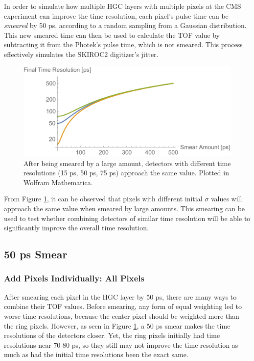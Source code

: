 \documentclass[twocolumn,aps,prd,reprint,superscriptaddress,floatfix]{revtex4-1}
\begin{document}
In order to simulate how multiple HGC layers with multiple pixels at the CMS experiment can improve the time resolution, each pixel's pulse time can be \textit{smeared} by 50 ps, according to a random sampling from a Gaussian distribution.
This new smeared time can then be used to calculate the TOF value by subtracting it from the Photek's pulse time, which is not smeared.
This process effectively simulates the SKIROC2 digitizer's jitter.

\begin{figure}[!htbp]
	\centering
	\includegraphics[width=\linewidth]{mathematica_plot.pdf}
	\caption{After being smeared by a large amount, detectors with different time resolutions (15 ps, 50 ps, 75 ps) approach the same value. Plotted in Wolfram Mathematica.}
	\label{fig:mathematica_plot}
\end{figure}

From Figure \ref{fig:mathematica_plot}, it can be observed that pixels with different initial $\sigma$ values will approach the same value when smeared by large amounts. 
This smearing can be used to test whether combining detectors of similar time resolution will be able to significantly improve the overall time resolution.

\subsection{50 ps Smear}
\subsubsection{Add Pixels Individually: All Pixels}
After smearing each pixel in the HGC layer by 50 ps, there are many ways to combine their TOF values. 
Before smearing, any form of equal weighting led to worse time resolutions, because the center pixel should be weighted more than the ring pixels.
However, as seen in Figure \ref{fig:mathematica_plot}, a 50 ps smear makes the time resolutions of the detectors closer. 
Yet, the ring pixels initially had time resolutions near 70-80 ps, so they still may not improve the time resolution as much as had the initial time resolutions been the exact same.
\end{document}
